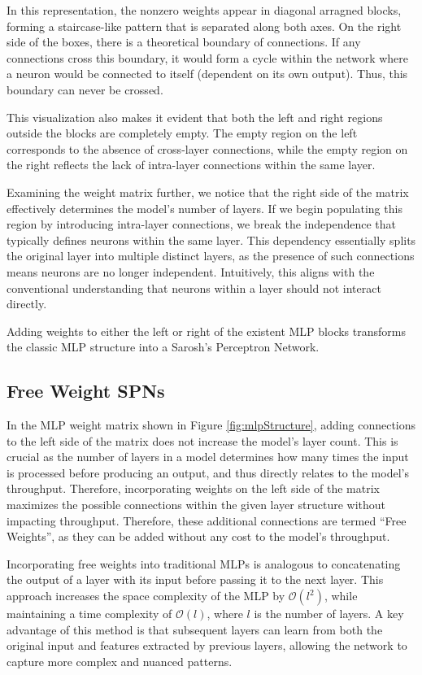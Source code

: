In this representation, the nonzero weights appear in diagonal arragned blocks, forming a staircase-like pattern that is separated along both axes. On the right side of the boxes, there is a theoretical boundary of connections. If any connections cross this boundary, it would form a cycle within the network where a neuron would be connected to itself (dependent on its own output). Thus, this boundary can never be crossed.

This visualization also makes it evident that both the left and right regions outside the blocks are completely empty. The empty region on the left corresponds to the absence of cross-layer connections, while the empty region on the right reflects the lack of intra-layer connections within the same layer.

Examining the weight matrix further, we notice that the right side of the matrix effectively determines the model’s number of layers. If we begin populating this region by introducing intra-layer connections, we break the independence that typically defines neurons within the same layer. This dependency essentially splits the original layer into multiple distinct layers, as the presence of such connections means neurons are no longer independent. Intuitively, this aligns with the conventional understanding that neurons within a layer should not interact directly.

Adding weights to either the left or right of the existent MLP blocks transforms the classic MLP structure into a Sarosh’s Perceptron Network.

\subsection{Free Weight SPNs}

In the MLP weight matrix shown in Figure \ref{fig:mlpStructure}, adding connections to the left side of the matrix does not increase the model's layer count. This is crucial as the number of layers in a model determines how many times the input is processed before producing an output, and thus directly relates to the model’s throughput. Therefore, incorporating weights on the left side of the matrix maximizes the possible connections within the given layer structure without impacting throughput. Therefore, these additional connections are termed “Free Weights”, as they can be added without any cost to the model's throughput. 

Incorporating free weights into traditional MLPs is analogous to concatenating the output of a layer with its input before passing it to the next layer. This approach increases the space complexity of the MLP by $\mathcal{O}(l^2)$, while maintaining a time complexity of $\mathcal{O}(l)$, where $l$ is the number of layers. A key advantage of this method is that subsequent layers can learn from both the original input and features extracted by previous layers, allowing the network to capture more complex and nuanced patterns.

